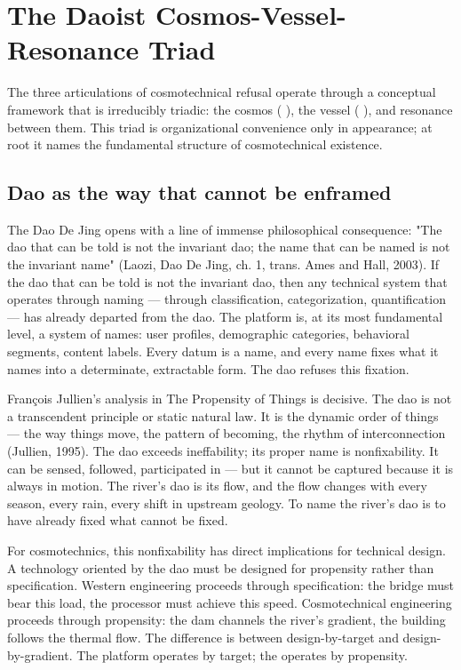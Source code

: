 \section{The Daoist Cosmos-Vessel-Resonance Triad}

The three articulations of cosmotechnical refusal operate through a conceptual framework that is irreducibly triadic: the cosmos (  ), the vessel (  ), and resonance between them. This triad is organizational convenience only in appearance; at root it names the fundamental structure of cosmotechnical existence.

\subsection{Dao as the way that cannot be enframed}

The Dao De Jing opens with a line of immense philosophical consequence: "The dao that can be told is not the invariant dao; the name that can be named is not the invariant name" (Laozi, Dao De Jing, ch. 1, trans. Ames and Hall, 2003). If the dao that can be told is not the invariant dao, then any technical system that operates through naming — through classification, categorization, quantification — has already departed from the dao. The platform is, at its most fundamental level, a system of names: user profiles, demographic categories, behavioral segments, content labels. Every datum is a name, and every name fixes what it names into a determinate, extractable form. The dao refuses this fixation.

François Jullien's analysis in The Propensity of Things is decisive. The dao is not a transcendent principle or static natural law. It is the dynamic order of things — the way things move, the pattern of becoming, the rhythm of interconnection (Jullien, 1995). The dao exceeds ineffability; its proper name is nonfixability. It can be sensed, followed, participated in — but it cannot be captured because it is always in motion. The river's dao is its flow, and the flow changes with every season, every rain, every shift in upstream geology. To name the river's dao is to have already fixed what cannot be fixed.

For cosmotechnics, this nonfixability has direct implications for technical design. A technology oriented by the dao must be designed for propensity rather than specification. Western engineering proceeds through specification: the bridge must bear this load, the processor must achieve this speed. Cosmotechnical engineering proceeds through propensity: the dam channels the river's gradient, the building follows the thermal flow. The difference is between design-by-target and design-by-gradient. The platform operates by target; the   operates by propensity.


